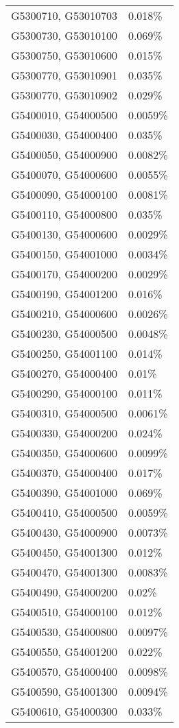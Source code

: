 \begin{longtable}[]{@{}ll@{}}
G5300710, G53010703 & 0.018\% \\
G5300730, G53010100 & 0.069\% \\
G5300750, G53010600 & 0.015\% \\
G5300770, G53010901 & 0.035\% \\
G5300770, G53010902 & 0.029\% \\
G5400010, G54000500 & 0.0059\% \\
G5400030, G54000400 & 0.035\% \\
G5400050, G54000900 & 0.0082\% \\
G5400070, G54000600 & 0.0055\% \\
G5400090, G54000100 & 0.0081\% \\
G5400110, G54000800 & 0.035\% \\
G5400130, G54000600 & 0.0029\% \\
G5400150, G54001000 & 0.0034\% \\
G5400170, G54000200 & 0.0029\% \\
G5400190, G54001200 & 0.016\% \\
G5400210, G54000600 & 0.0026\% \\
G5400230, G54000500 & 0.0048\% \\
G5400250, G54001100 & 0.014\% \\
G5400270, G54000400 & 0.01\% \\
G5400290, G54000100 & 0.011\% \\
G5400310, G54000500 & 0.0061\% \\
G5400330, G54000200 & 0.024\% \\
G5400350, G54000600 & 0.0099\% \\
G5400370, G54000400 & 0.017\% \\
G5400390, G54001000 & 0.069\% \\
G5400410, G54000500 & 0.0059\% \\
G5400430, G54000900 & 0.0073\% \\
G5400450, G54001300 & 0.012\% \\
G5400470, G54001300 & 0.0083\% \\
G5400490, G54000200 & 0.02\% \\
G5400510, G54000100 & 0.012\% \\
G5400530, G54000800 & 0.0097\% \\
G5400550, G54001200 & 0.022\% \\
G5400570, G54000400 & 0.0098\% \\
G5400590, G54001300 & 0.0094\% \\
G5400610, G54000300 & 0.033\% \\

\end{longtable}
